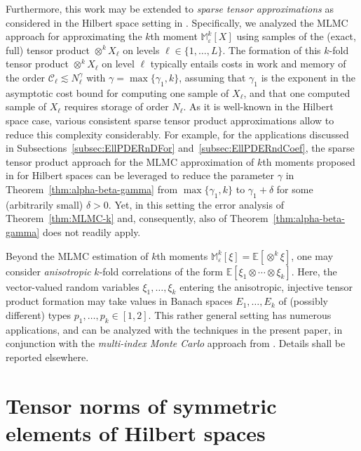 \documentclass[reqno]{amsart}
\numberwithin{equation}{section}
\newcommand{\bbE}{\mathbb{E}}
\newcommand{\bbM}{\mathbb{M}}
\newcommand{\cC}{\mathcal{C}}
\newcommand{\xk}{\otimes^k}
\newcommand{\Mk}{\bbM^k_\varepsilon}
\theoremstyle{remark}
\theoremstyle{definition}
\begin{document}
Furthermore, this work 
may be extended to 
\emph{sparse tensor approximations}
as considered in the 
Hilbert space setting in \cite{BarthSchwabZollinger2011}. 
Specifically, 
we analyzed the MLMC approach 
for approximating the $k$th moment $\Mk[X]$ 
using samples of the (exact, full) tensor 
product $\otimes^k X_\ell$ 
on levels $\ell\in\{1,\ldots,L\}$. 
%
The formation of this $k$-fold  
tensor product $\otimes^k X_\ell$
on level $\ell$ 
typically entails costs in work and memory 
of the order $\cC_\ell \lesssim N_\ell^{\gamma}$ 
with $\gamma = \max\{\gamma_1,k\}$, 
assuming that $\gamma_1$ is the exponent 
in the asymptotic cost bound 
for computing one sample of $X_\ell$, 
and that one computed sample of $X_\ell$ 
requires storage of order $N_\ell$. 
As it is well-known 
in the Hilbert space case, 
various consistent  
sparse tensor product approximations 
allow to reduce this complexity considerably. 
For example, for the applications discussed 
in Subsections~\ref{subsec:EllPDERnDFor} 
and~\ref{subsec:EllPDERndCoef}, 
the sparse tensor product approach 
for the MLMC approximation 
of $k$th moments 
proposed in \cite{BarthSchwabZollinger2011} 
for Hilbert spaces 
can be leveraged to reduce the parameter $\gamma$ in 
Theorem~\ref{thm:alpha-beta-gamma} 
from $\max\{\gamma_1,k\}$
to $\gamma_1 + \delta$ for some 
(arbitrarily small) $\delta>0$. 
Yet, in this setting
the error analysis of Theorem~\ref{thm:MLMC-k} 
and, consequently, 
also of Theorem~\ref{thm:alpha-beta-gamma} 
does not readily apply. 

Beyond the MLMC estimation 
of $k$th moments $\Mk[\xi] = \bbE[\xk \xi]$, 
one may consider 
\emph{anisotropic} $k$-fold 
correlations of the form 
$\bbE[\xi_1\otimes\cdots\otimes\xi_k]$.  
Here, the vector-valued random variables $\xi_1,\ldots,\xi_k$ 
entering the anisotropic, 
injective tensor product formation 
may take values in Banach spaces 
$E_1,\ldots,E_k$ of (possibly different) types 
$p_1,\ldots,p_k\in[1,2]$. 
This rather general setting has numerous applications, 
and can be analyzed with the techniques in the present paper, 
in conjunction with the \emph{multi-index Monte Carlo} 
approach from \cite{MIMC2016}.
Details shall be reported elsewhere.  

\appendix 

\section{Tensor norms of symmetric elements of Hilbert spaces}
\label{appendix:norm-computation} 
\end{document}
